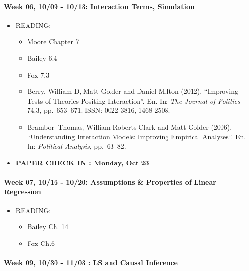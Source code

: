 \documentclass[11pt,]{article}
\providecommand{\tightlist}{%
  \setlength{\itemsep}{0pt}\setlength{\parskip}{0pt}}
\begin{document}
\paragraph{Week 06, 10/09 - 10/13: Interaction Terms,
Simulation}\label{week-06-1009---1013-interaction-terms-simulation}

\begin{itemize}
\tightlist
\item
  READING:

  \begin{itemize}
  \item
    Moore Chapter 7
  \item
    Bailey 6.4
  \item
    Fox 7.3
  \item
     Berry, William D, Matt Golder and Daniel Milton
    (2012). ``Improving Tests of Theories Positing Interaction''. En.
    In: \emph{The Journal of Politics} 74.3, pp.~653--671. ISSN:
    0022-3816, 1468-2508.
  \item
     Brambor, Thomas, William Roberts Clark and Matt
    Golder (2006). ``Understanding Interaction Models: Improving
    Empirical Analyses''. En. In: \emph{Political Analysis}, pp.~63--82.
  \end{itemize}
\item
  \textbf{PAPER CHECK IN : Monday, Oct 23 }
\end{itemize}

\paragraph{Week 07, 10/16 - 10/20: Assumptions \& Properties of Linear
Regression}\label{week-07-1016---1020-assumptions-properties-of-linear-regression}

\begin{itemize}
\tightlist
\item
  READING:

  \begin{itemize}
  \tightlist
  \item
    Bailey Ch. 14
  \item
    Fox Ch.6
  \end{itemize}
\end{itemize}

\paragraph{Week 09, 10/30 - 11/03 : LS and Causal
Inference}\label{week-09-1030---1103-ls-and-causal-inference}
\end{document}
